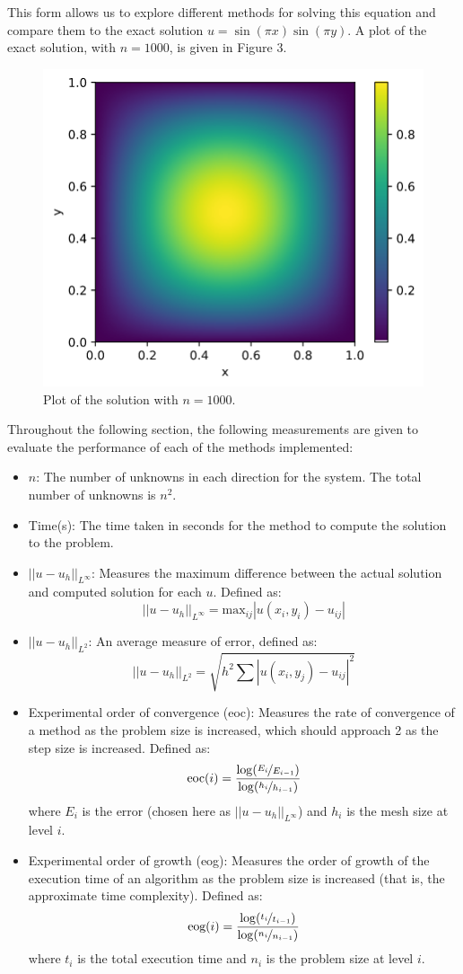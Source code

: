 \documentclass{article}
\numberwithin{equation}{section}
\begin{document}
This form allows us to explore different methods for solving this equation and compare them to the exact solution $u = \sin(\pi x) \sin(\pi y)$. A plot of the exact solution, with $n=1000$, is given in Figure 3. 

\begin{figure}[H]
\includegraphics[scale=.5]{img/solution2.png}
\centering
\caption{Plot of the solution with $n=1000$.}
\end{figure} 

Throughout the following section, the following measurements are given to evaluate the performance of each of the methods implemented:
\begin{itemize}
\item $n$: The number of unknowns in each direction for the system. The total number of unknowns is $n^2$.
\item Time(s): The time taken in seconds for the method to compute the solution to the problem.
\item $|| u - u_h ||_{L^\infty} $: Measures the maximum difference between the actual solution and computed solution for each $u$. Defined as:
 \[ || u - u_h ||_{L^\infty} = \text{max}_{ij} | u(x_i, y_i) - u_{ij} | \]
\item $|| u - u_h ||_{L^2} $: An average measure of error, defined as:
\[ || u - u_h ||_{L^2} = \sqrt{h^2 \sum | u(x_i,y_j) - u_{ij} |^2} \]
\item Experimental order of convergence (eoc): Measures the rate of convergence of a method as the problem size is increased, which should approach 2 as the step size is increased. Defined as:
\[ \text{eoc}(i) = \frac{\log(\nicefrac{E_i}{E_{i-1}})}{\log(\nicefrac{h_i}{h_{i-1}})} \]
where $E_i$ is the error (chosen here as $|| u - u_h ||_{L^\infty}$) and $h_i$ is the mesh size at level $i$. 
\item Experimental order of growth (eog): Measures the order of growth of the execution time of an algorithm as the problem size is increased (that is, the approximate time complexity). Defined as:
\[ \text{eog}(i) = \frac{\log(\nicefrac{t_{i}}{t_{i-1}})}{\log(\nicefrac{n_{i}}{n_{i-1}})} \]
where $t_i$ is the total execution time and $n_i$ is the problem size at level $i$.
\end{itemize}
\end{document}
